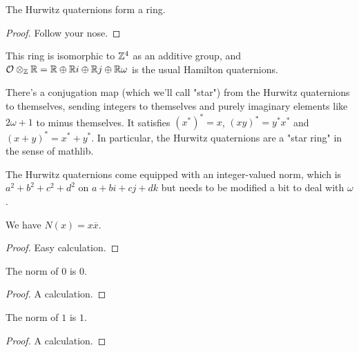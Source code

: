 \begin{lemma}
    \label{Hurwitz.ring}
    \leanok
    The Hurwitz quaternions form a ring.
\end{lemma}
\begin{proof}
    \leanok
    Follow your nose.
\end{proof}


This ring is isomorphic to $\mathbb{Z}^4$ as an additive group, and
$\mathcal{O}\otimes_{\mathbb{Z}}\mathbb{R}=\mathbb{R}\oplus \mathbb{R} i\oplus \mathbb{R} j\oplus\mathbb{R} \omega$
is the usual Hamilton quaternions.

\begin{definition}
    \label{Hurwitz.starRing}
    \leanok
    There's a conjugation map (which we'll call "star") from the Hurwitz quaternions to themselves, sending
    integers to themselves and purely imaginary elements like $2\omega+1$ to minus themselves.
    It satisfies $(x^*)^*=x$, $(xy)^*=y^*x^*$ and $(x+y)^*=x^*+y^*$. In particular, the Hurwitz
    quaternions are a "star ring" in the sense of mathlib.
\end{definition}

\begin{definition}
    \label{Hurwitz.norm}
    \leanok
    The Hurwitz quaternions come equipped with an integer-valued norm, which is
    $a^2+b^2+c^2+d^2$ on $a+bi+cj+dk$ but needs to be modified a bit to deal with $\omega$.
\end{definition}

\begin{lemma}
    \label{Hurwitz.norm_eq_mul_conj}
    \leanok
    We have $N(x)=x\overline{x}$.
\end{lemma}
\begin{proof}
    \leanok
    Easy calculation.
\end{proof}

\begin{lemma}
    \label{Hurwitz.norm_zero}
    \leanok
    The norm of $0$ is $0$.
\end{lemma}
\begin{proof}
    \leanok
    A calculation.
\end{proof}

\begin{lemma}
    \label{Hurwitz.norm_one}
    \leanok
    The norm of $1$ is $1$.
\end{lemma}
\begin{proof}
    \leanok
    A calculation.
\end{proof}

